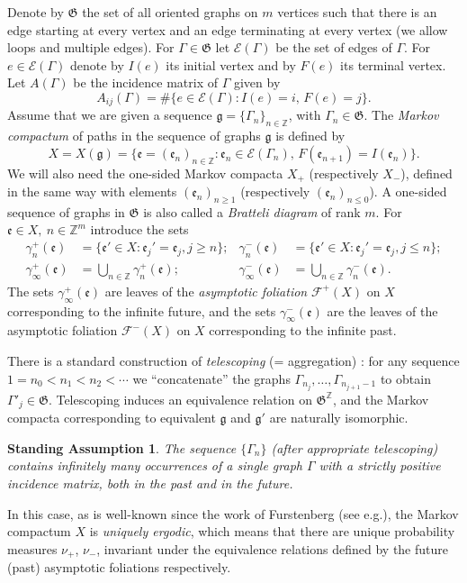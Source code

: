\documentclass[10pt]{amsart}
\let\mathcal\mathscr
\newcommand{\sep}{:}
\theoremstyle{plain}
\newtheorem*{standass}{Standing Assumption}
\theoremstyle{definition}
\let\gam\gamma
\let\Gam\Gamma
\newcommand\ef{\mathfrak{e}}
\newcommand\gf{\mathfrak{g}}
\newcommand\Frg{\mathfrak{G}}
\newcommand{\Ek}{\mathcal{E}}
\newcommand{\Fk}{\mathcal{F}}
\newcommand{\Z}{\mathbb{Z}}
\providecommand{\eg}{e.g.}\providecommand{\ie}{i.e.}\providecommand{\etc}{etc.}\providecommand{\resp}{resp.}\providecommand{\cf}{cf.}
\begin{document}
Denote by $\Frg$ the set of all oriented graphs on $m$ vertices such that there is an edge starting at every vertex and an edge terminating at every vertex (we allow loops and multiple edges).
For $\Gam\in \Frg$ let $\Ek(\Gam)$ be the set of edges of $\Gam$. For $e\in \Ek(\Gam)$ denote by $I(e)$ its initial vertex and by $F(e)$ its terminal vertex. Let $A(\Gam)$ be the incidence matrix of $\Gam$ given by
\[
A_{ij}(\Gam) = \#\{e\in \Ek(\Gam)\sep I(e) = i,\,F(e) = j\}.
\]
Assume that we are given a sequence $\gf = \{\Gam_n\}_{n\in \Z}$, with $\Gam_n \in \Frg$. The \emph{Markov compactum} of paths in the sequence of graphs $\gf$ is defined by
\[
X = X(\gf) = \{\ef = (\ef_n)_{n\in \Z}\sep \ef_n \in \Ek(\Gam_n),\, F(\ef_{n+1}) = I(\ef_n)\}.
\]
We will also need the one-sided Markov compacta $X_+$ (respectively $X_-$), defined in the same way with elements $(\ef_n)_{n\ge 1}$ (respectively $(\ef_n)_{n\le 0}$). A one-sided sequence of graphs in $\Frg$ is also called a \emph{Bratteli diagram} of rank $m$.
For $\ef\in X,\ n\in \Z^m$ introduce the sets
\begin{align*}
\gam_n^+(\ef) &= \{\ef'\in X\sep \ef_j'=\ef_j, j\ge n\};& \gam_n^-(\ef) &= \{\ef'\in X\sep \ef_j'=\ef_j, j\le n\};\\
\gam_\infty^+(\ef) &= \bigcup_{n\in \Z} \gam_n^+(\ef);& \gam_\infty^-(\ef) &= \bigcup_{n\in \Z} \gam_n^-(\ef).
\end{align*}
The sets $\gam_\infty^+(\ef)$ are leaves of the \emph{asymptotic foliation} $\Fk^+(X)$ on $X$ corresponding to the infinite future, and the sets $\gam_\infty^-(\ef)$
are the leaves of the asymptotic foliation $\Fk^-(X)$ on $X$ corresponding to the infinite past.

There is a standard construction of \emph{telescoping} (= aggregation) \cite[2.4]{Buf-umn}: for any sequence $1=n_0<n_1 < n_2< \cdots$ we ``concatenate'' the graphs
$\Gam_{n_j},\ldots, \Gam_{n_{j+1}-1}$ to obtain $\Gam'_j\in \Frg$. Telescoping induces an equivalence relation on $\Frg^\Z$, and the Markov compacta corresponding to equivalent $\gf$ and $\gf'$ are naturally isomorphic.

\begin{standass}
The sequence $\{\Gam_n\}$ (after appropriate
telescoping) contains infinitely many occurrences of a single graph $\Gam$ with a strictly positive incidence matrix, both in the past and in the future.
\end{standass}

In this case, as is
well-known since the work of Furstenberg (see \eg \cite[(16.13)]{furst}), the
Markov compactum $X$ is \emph{uniquely ergodic}, which means that there are unique probability measures $\nu_+$, $\nu_-$, invariant under the equivalence relations defined by the future (past) asymptotic foliations respectively.
\end{document}
